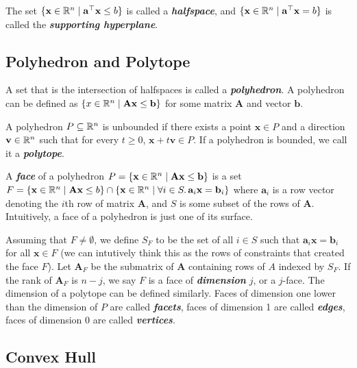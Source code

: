 The set $\{ \mathbf{x} \in \mathbb{R}^n \mid \mathbf{a}^\top \mathbf{x} \leq b \}$ is called a \textit{\textbf{halfspace}}, and $\{ \mathbf{x} \in \mathbb{R}^n \mid \mathbf{a}^\top \mathbf{x} = b \}$ is called the \textit{\textbf{supporting hyperplane}}.

\subsection{Polyhedron and Polytope}    

A set that is the intersection of halfspaces is called a \textit{\textbf{polyhedron}}. A polyhedron can be defined as $\{x \in \mathbb{R}^n \mid \mathbf{A}\mathbf{x} \leq \mathbf{b} \}$ for some matrix $\mathbf{A}$ and vector $\mathbf{b}$.

A polyhedron $P \subseteq \mathbb{R}^n$ is unbounded if there exists a point $\mathbf{x} \in P$ and a direction $\mathbf{v} \in \mathbb{R}^n$ such that for every $t \geq 0$, $\mathbf{x} + t \mathbf{v} \in P$. If a polyhedron is bounded, we call it a \textit{\textbf{polytope}}.

A \textit{\textbf{face}} of a polyhedron $P = \{\mathbf{x} \in \mathbb{R}^n \mid \mathbf{A}\mathbf{x} \leq \mathbf{b} \}$ is a set $F = \{ \mathbf{x} \in \mathbb{R}^n \mid \mathbf{A}\mathbf{x} \leq b \} \cap \{ \mathbf{x} \in \mathbb{R}^n \mid \forall i \in S.\, \mathbf{a}_i \mathbf{x} = \mathbf{b}_i \}$ where $\mathbf{a}_i$ is a row vector denoting the $i$th row of matrix $\mathbf{A}$, and $S$ is some subset of the rows of $\mathbf{A}$. Intuitively, a face of a polyhedron is just one of its surface.

Assuming that $F \neq \emptyset$, we define $S_F$ to be the set of all $i \in S$ such that $\mathbf{a}_i \mathbf{x} = \mathbf{b}_i$ for all $\mathbf{x} \in F$ (we can intutively think this as the rows of constraints that created the face $F$). Let $\mathbf{A}_F$ be the submatrix of $\mathbf{A}$ containing rows of $A$ indexed by $S_F$. If the rank of $\mathbf{A}_F$ is $n-j$, we say $F$ is a face of \textit{\textbf{dimension}} $j$, or a $j$-face. The dimension of a polytope can be defined similarly. Faces of dimension one lower than the dimension of $P$ are called \textit{\textbf{facets}}, faces of dimension 1 are called \textit{\textbf{edges}}, faces of dimension 0 are called \textit{\textbf{vertices}}.

\subsection{Convex Hull}

